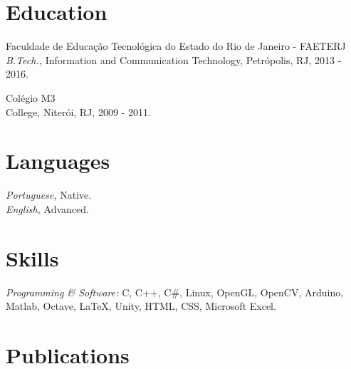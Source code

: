 \documentclass[margin, 10pt]{res} %
\begin{document}
\begin{resume}
\section{Education}

Faculdade de Educação Tecnológica do Estado do Rio de Janeiro - FAETERJ\\
{\sl B.Tech.,} Information and Communication Technology, Petrópolis, RJ, 2013 - 2016.

Colégio M3 \\
College, Niterói, RJ, 2009 - 2011.
 

\section{Languages}
{\sl Portuguese,} Native.\\
{\sl English,} Advanced.


\section{Skills} 

{\sl Programming \& Software:} C, C++, C\#, Linux, OpenGL, OpenCV, Arduino, Matlab, Octave, LaTeX, Unity, HTML, CSS, Microsoft Excel.
 

\section{Publications} 
 


\end{resume}
\end{document}
